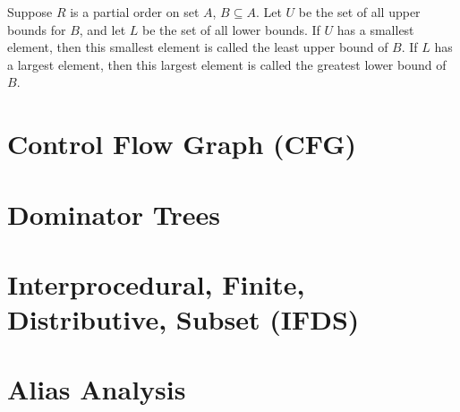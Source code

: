 Suppose $R$ is a partial order on set $A$, $B \subseteq A$. Let $U$ be the set
of all upper bounds for $B$, and let $L$ be the set of all lower bounds. If $U$
has a smallest element, then this smallest element is called the least upper
bound of $B$. If $L$ has a largest element, then this largest element is called
the greatest lower bound of $B$.

\section{Control Flow Graph (CFG)}


\section{Dominator Trees}


\section{Interprocedural, Finite, Distributive, Subset (IFDS)}

\section{Alias Analysis}
